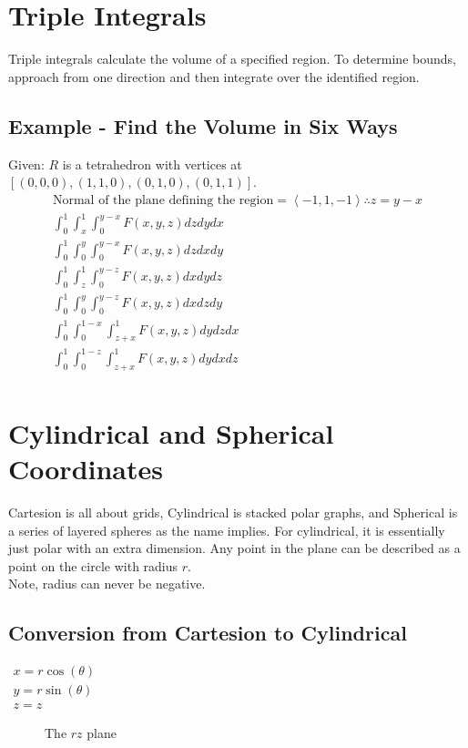 \documentclass{article}
\newcommand{\nvec}[1]{\left\langle #1 \right\rangle}
\begin{document}
\section{Triple Integrals}
Triple integrals calculate the volume of a specified region. To determine bounds, approach from one direction and then integrate over the identified region.
    \subsection{Example - Find the Volume in Six Ways}
    Given: $R$ is a tetrahedron with vertices at $[(0,0,0), (1,1,0), (0,1,0), (0,1,1)]$.
    \[
    \begin{aligned}
    \text{Normal of the plane defining the region} = \nvec{-1,1,-1} \therefore z=y-x\\
    \int_0^1 \int_x^1 \int_0^{y-x} F(x,y,z) dzdydx\\
    \int_0^1 \int_0^y \int_0^{y-x} F(x,y,z) dzdxdy\\
    \int_0^1 \int_z^1 \int_0^{y-z} F(x,y,z) dxdydz\\
    \int_0^1 \int_0^y \int_0^{y-z} F(x,y,z) dxdzdy\\
    \int_0^1 \int_0^{1-x} \int_{z+x}^1 F(x,y,z) dydzdx\\
    \int_0^1 \int_0^{1-z} \int_{z+x}^1 F(x,y,z) dydxdz\\
    \end{aligned}
    \]
\section{Cylindrical and Spherical Coordinates}
Cartesion is all about grids, Cylindrical is stacked polar graphs, and Spherical is a series of layered spheres as the name implies. For cylindrical, it is essentially just polar with an extra dimension. Any point in the plane can be described as a point on the circle with radius $r$.\\
Note, radius can never be negative.

    \subsection{Conversion from Cartesion to Cylindrical}
    $
    \begin{aligned}
    x=r\cos(\theta)\\y=r\sin(\theta)\\z=z
    \end{aligned}
    $

    \begin{figure}[ht]
    \centering
    \caption{The $rz$ plane}
    \end{figure}
\end{document}
